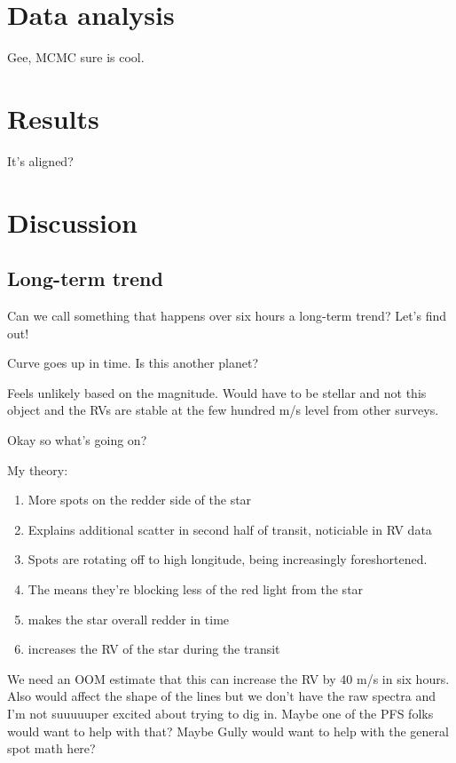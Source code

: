 \documentclass[twocolumn]{aastex62}
\begin{document}
\section{Data analysis}

Gee, MCMC sure is cool.


\section{Results}

It's aligned?

\section{Discussion}

\subsection{Long-term trend}

Can we call something that happens over six hours a long-term trend? Let's find out!

Curve goes up in time. Is this another planet?

Feels unlikely based on the magnitude.
Would have to be stellar and not this object and the RVs are stable at the few hundred m/s level from other surveys.

Okay so what's going on?

My theory:
\begin{enumerate}
    \item More spots on the redder side of the star 
    \item Explains additional scatter in second half of transit, noticiable in RV data
    \item Spots are rotating off to high longitude, being increasingly foreshortened.
    \item The means they're blocking less of the red light from the star
    \item makes the star overall redder in time
    \item increases the RV of the star during the transit
\end{enumerate}

We need an OOM estimate that this can increase the RV by 40 m/s in six hours.
Also would affect the shape of the lines but we don't have the raw spectra and I'm not suuuuuper excited about trying to dig in. Maybe one of the PFS folks would want to help with that? 
Maybe Gully would want to help with the general spot math here?
\end{document}
